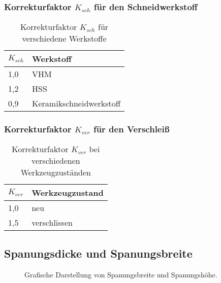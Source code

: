 \documentclass[fleqn,10pt]{techReport} %
\begin{document}
\subsubsection*{Korrekturfaktor $K_{sch}$ für den Schneidwerkstoff}

\begin{table}[H]
\begin{tabular}{|l|l|}
\hline
$K_{sch}$ & Werkstoff \\
\hline
1,0 & VHM \\
\hline
1,2 & HSS \\
\hline
0,9 & Keramikschneidwerkstoff \\
\hline
\end{tabular}
\caption[Korrekturfaktor $K_{sch}$]{Korrekturfaktor $K_{sch}$ für verschiedene Werkstoffe}
\label{tab:K_sch}
\end{table}
    
\subsubsection*{Korrekturfaktor $K_{ver}$ für den Verschleiß}

\begin{table}[H]
\begin{tabular}{|l|l|}
\hline
$K_{ver}$ & Werkzeugzustand \\
\hline
1,0 & neu \\
\hline
1,5 & verschlissen \\
\hline
\end{tabular}
\caption[Korrekturfaktor $K_{ver}$]{Korrekturfaktor $K_{ver}$ bei verschiedenen Werkzeugzuständen}
\label{tab:K_ver}
\end{table}

\subsection*{Spanungsdicke und Spanungsbreite}

\begin{figure}[H]
\centering
\caption[Grafische Darstellung von Spanungsbreite und Spanungshöhe]{Grafische Darstellung von Spanungsbreite und Spanungshöhe.}
\label{fig:Spanungsbreitte_hoehe}
\end{figure}
\end{document}
